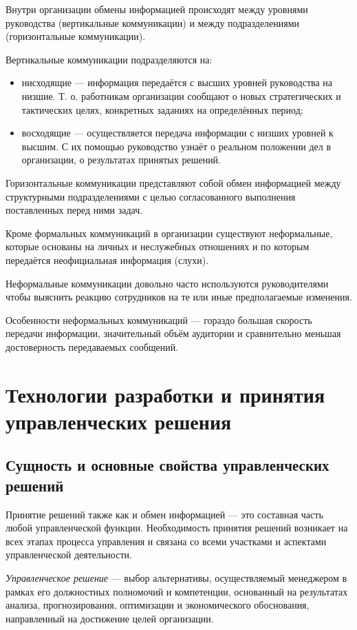\documentclass[12pt, russian, oneside, article]{ncc}
\begin{document}
Внутри организации обмены информацией происходят между уровнями руководства (вертикальные коммуникации) и между подразделениями (горизонтальные коммуникации).

Вертикальные коммуникации подразделяются на:
\begin{itemize}
\item нисходящие --- информация передаётся с высших уровней руководства на низшие. Т. о. работникам организации сообщают о новых стратегических и тактических целях, конкретных заданиях на определённых период;
\item восходящие --- осуществляется передача информации с низших уровней к высшим. С их помощью руководство узнаёт о реальном положении дел в организации, о результатах принятых решений.
\end{itemize}

Горизонтальные коммуникации представляют собой обмен информацией между структурными подразделениями с целью согласованного выполнения поставленных перед ними задач.

Кроме формальных коммуникаций в организации существуют неформальные, которые основаны на личных и неслужебных отношениях и по которым передаётся неофициальная информация (слухи).

Неформальные коммуникации довольно часто используются руководителями чтобы выяснить реакцию сотрудников на те или иные предполагаемые изменения.

Особенности неформальных коммуникаций --- гораздо большая скорость передачи информации, значительный объём аудитории и сравнительно меньшая достоверность передаваемых сообщений.
\section{Технологии разработки и принятия управленческих решения}
\label{sec-6}
\subsection{Сущность и основные свойства управленческих решений}
\label{sec-6_1}


Принятие решений также как и обмен информацией --- это составная часть любой управленческой функции. Необходимость принятия решений возникает на всех этапах процесса управления и связана со всеми участками и аспектами управленческой деятельности.

\emph{Управленческое решение} --- выбор альтернативы, осуществляемый менеджером в рамках его должностных полномочий и компетенции, основанный на результатах анализа, прогнозирования, оптимизации и экономического обоснования, направленный на достижение целей организации.
\end{document}

